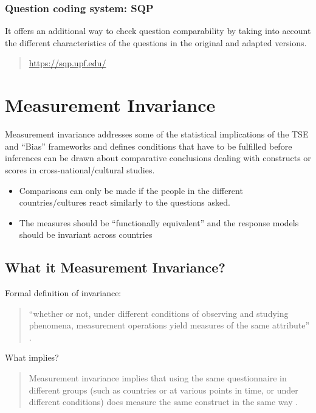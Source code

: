 \documentclass[
]{book}
\begin{document}
\hypertarget{question-coding-system-sqp}{%
\subsection{Question coding system: SQP}\label{question-coding-system-sqp}}

It offers an additional way to check question comparability by taking into account the different characteristics of the questions in the original and adapted versions.

\begin{quote}
\url{https://sqp.upf.edu/}
\end{quote}

\hypertarget{invariance}{%
\chapter{Measurement Invariance}\label{invariance}}

Measurement invariance addresses some of the statistical implications of the TSE and ``Bias'' frameworks and defines conditions that have to be fulfilled before inferences can be drawn about comparative conclusions dealing with constructs or scores in cross-national/cultural studies.

\begin{itemize}
\item
  Comparisons can only be made if the people in the different countries/cultures react similarly to the questions asked.
\item
  The measures should be ``functionally equivalent'' and the response models should be invariant across countries
\end{itemize}

\hypertarget{what-it-measurement-invariance}{%
\section{What it Measurement Invariance?}\label{what-it-measurement-invariance}}

Formal definition of invariance:

\begin{quote}
``whether or not, under different conditions of observing and studying phenomena, measurement operations yield measures of the same attribute'' \citep[p.~117]{Horn1992}.
\end{quote}

What implies?

\begin{quote}
Measurement invariance implies that using the same questionnaire in different groups (such as countries or at various points in time, or under different conditions) does measure the same construct in the same way \citep{Chen2008, Davidov2014, Horn1992, Millsap2011}.
\end{quote}
\end{document}
